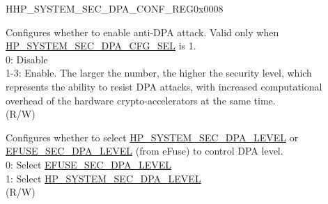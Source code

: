 \begin{register}{H}{HP\_SYSTEM\_SEC\_DPA\_CONF\_REG}{0x0008}\label{regdesc:HPSYSTEMSECDPACONFREG}
%
%
%
\regnewline%
\begin{regdesc}\begin{reglist}
\label{fielddesc:HPSYSTEMSECDPALEVEL}\item [HP\_SYSTEM\_SEC\_DPA\_LEVEL] Configures whether to enable anti-DPA attack. Valid only when \hyperref[fielddesc:HPSYSTEMSECDPACFGSEL]{HP\_SYSTEM\_SEC\_DPA\_CFG\_SEL} is 1. \\
0: Disable\\
1-3: Enable. The larger the number, the higher the security level, which represents the ability to resist DPA attacks, with increased computational overhead of the hardware crypto-accelerators at the same time. \\
(R/W)
\label{fielddesc:HPSYSTEMSECDPACFGSEL}\item [HP\_SYSTEM\_SEC\_DPA\_CFG\_SEL] Configures whether to select \hyperref[fielddesc:HPSYSTEMSECDPALEVEL]{HP\_SYSTEM\_SEC\_DPA\_LEVEL} or \hyperref[fielddesc:EFUSESECDPALEVEL]{EFUSE\_SEC\_DPA\_LEVEL} (from eFuse) to control DPA level. \\
0: Select \hyperref[fielddesc:EFUSESECDPALEVEL]{EFUSE\_SEC\_DPA\_LEVEL}\\
1: Select \hyperref[fielddesc:HPSYSTEMSECDPALEVEL]{HP\_SYSTEM\_SEC\_DPA\_LEVEL}\\
(R/W)
\end{reglist}\end{regdesc}
\end{register}


